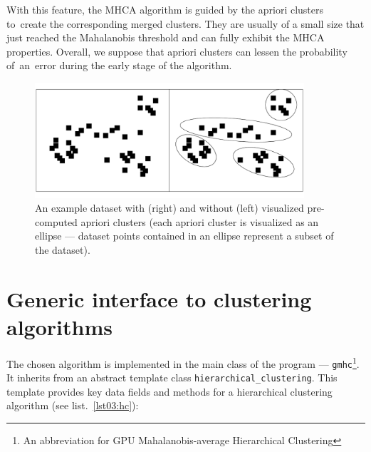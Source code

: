 With this feature, the MHCA algorithm is guided by the apriori clusters to~create the corresponding merged clusters. They are usually of a small size that just reached the Mahalanobis threshold and can fully exhibit the MHCA properties. Overall, we suppose that apriori clusters can lessen the probability of~an~error during the early stage of the algorithm.


\begin{figure}\centering
	\includegraphics[width=10cm]{img/apriori_example}
	\caption{An example dataset with (right) and without (left) visualized pre-computed apriori clusters (each apriori cluster is visualized as an ellipse --- dataset points contained in an ellipse represent a subset of the dataset).}
	\label{fig03:apr_ex}
\end{figure}

\section{Generic interface to clustering algorithms}

The chosen algorithm is implemented in the main class of the program --- \texttt{gmhc}\footnote{An abbreviation for GPU Mahalanobis-average Hierarchical Clustering}. It inherits from an abstract template class \texttt{hierarchical\_clustering}.
This template provides key data fields and methods for a hierarchical clustering algorithm (see list.~\ref{lst03:hc}): 

